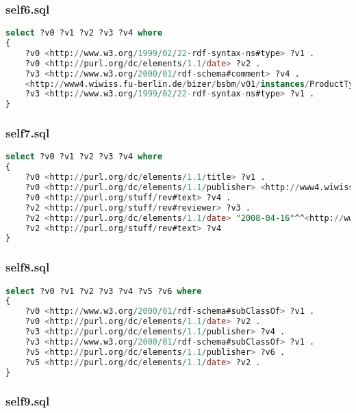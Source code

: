 \documentclass[titlepage, a4paper, 12pt] {article}
\begin{document}
\subsubsection{self6.sql}

\begin{lstlisting}[language=SQL] 
select ?v0 ?v1 ?v2 ?v3 ?v4 where
{
	?v0 <http://www.w3.org/1999/02/22-rdf-syntax-ns#type> ?v1 .
	?v0 <http://purl.org/dc/elements/1.1/date> ?v2 .
	?v3 <http://www.w3.org/2000/01/rdf-schema#comment> ?v4 .
	<http://www4.wiwiss.fu-berlin.de/bizer/bsbm/v01/instances/ProductType2> <http://www.w3.org/2000/01/rdf-schema#comment> ?v4 .
	?v3 <http://www.w3.org/1999/02/22-rdf-syntax-ns#type> ?v1 .
}
\end{lstlisting}

\subsubsection{self7.sql}

\begin{lstlisting}[language=SQL] 
select ?v0 ?v1 ?v2 ?v3 ?v4 where
{
	?v0 <http://purl.org/dc/elements/1.1/title> ?v1 .
	?v0 <http://purl.org/dc/elements/1.1/publisher> <http://www4.wiwiss.fu-berlin.de/bizer/bsbm/v01/instances/dataFromRatingSite11/RatingSite11> .
	?v0 <http://purl.org/stuff/rev#text> ?v4 .
	?v2 <http://purl.org/stuff/rev#reviewer> ?v3 .
	?v2 <http://purl.org/dc/elements/1.1/date> "2008-04-16"^^<http://www.w3.org/2001/XMLSchema#date> .
	?v2 <http://purl.org/stuff/rev#text> ?v4
}
\end{lstlisting}

\subsubsection{self8.sql}

\begin{lstlisting}[language=SQL] 
select ?v0 ?v1 ?v2 ?v3 ?v4 ?v5 ?v6 where
{
	?v0 <http://www.w3.org/2000/01/rdf-schema#subClassOf> ?v1 .
	?v0 <http://purl.org/dc/elements/1.1/date> ?v2 .
	?v3 <http://purl.org/dc/elements/1.1/publisher> ?v4 .
	?v3 <http://www.w3.org/2000/01/rdf-schema#subClassOf> ?v1 .
	?v5 <http://purl.org/dc/elements/1.1/publisher> ?v6 .
	?v5 <http://purl.org/dc/elements/1.1/date> ?v2 .
}
\end{lstlisting}

\subsubsection{self9.sql}
\end{document}
